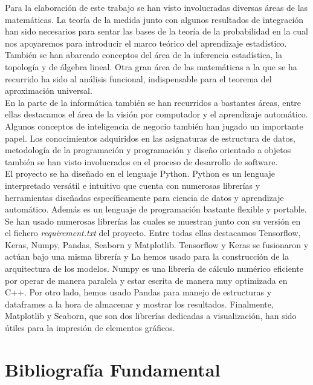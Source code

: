     Para la elaboración de este trabajo se han visto involucradas diversas áreas de las matemáticas. La teoría de la medida junto con algunos resultados de integración han sido necesarios para sentar las bases de la teoría de la probabilidad en la cual nos apoyaremos para introducir el marco teórico del aprendizaje estadístico. También se han abarcado conceptos del área de la inferencia estadística, la topología y de álgebra lineal. Otra gran área de las matemáticas a la que se ha recurrido ha sido al análisis funcional, indispensable para el teorema del aproximación universal. \\
    
    En la parte de la informática también se han recurridos a bastantes áreas, entre ellas destacamos el área de la visión por computador y el aprendizaje automático. Algunos conceptos de inteligencia de negocio también han jugado un importante papel. Los conocimientos adquiridos en las asignaturas de estructura de datos, metodología de la programación y programación y diseño orientado a objetos también se han visto involucrados en el proceso de desarrollo de software. \\
    
    El proyecto se ha diseñado en el lenguaje Python. Python es un lenguaje interpretado versátil e intuitivo que cuenta con numerosas librerías y herramientas diseñadas específicamente para ciencia de datos y aprendizaje automático. Además es un lenguaje de programación bastante flexible y portable. \\
    
    Se han usado numerosas librerías las cuales se muestran junto con su versión en el fichero \textit{requirement.txt} del proyecto. Entre todas ellas destacamos Tensorflow, Keras, Numpy, Pandas, Seaborn y Matplotlib. Tensorflow y Keras se fusionaron y actúan bajo una misma librería y La hemos usado para la construcción de la arquitectura de los modelos. Numpy es una librería de cálculo numérico eficiente por operar de manera paralela y estar escrita de manera muy optimizada en C++. Por otro lado, hemos usado Pandas para manejo de estructuras y dataframes a la hora de almacenar y mostrar los resultados. Finalmente, Matplotlib y Seaborn, que son dos librerías dedicadas a visualización, han sido útiles para la impresión de elementos gráficos. \\
    
    
\section{Bibliografía Fundamental}

